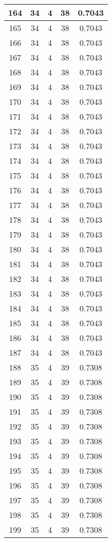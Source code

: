\documentclass[letterpaper, 12pt]{article}
\begin{document}
\begin{longtable}{|c|c|c|c|c|}
\hline
164 & 34 & 4 & 38 & 0.7043 \\
\hline
165 & 34 & 4 & 38 & 0.7043 \\
\hline
166 & 34 & 4 & 38 & 0.7043 \\
\hline
167 & 34 & 4 & 38 & 0.7043 \\
\hline
168 & 34 & 4 & 38 & 0.7043 \\
\hline
169 & 34 & 4 & 38 & 0.7043 \\
\hline
170 & 34 & 4 & 38 & 0.7043 \\
\hline
171 & 34 & 4 & 38 & 0.7043 \\
\hline
172 & 34 & 4 & 38 & 0.7043 \\
\hline
173 & 34 & 4 & 38 & 0.7043 \\
\hline
174 & 34 & 4 & 38 & 0.7043 \\
\hline
175 & 34 & 4 & 38 & 0.7043 \\
\hline
176 & 34 & 4 & 38 & 0.7043 \\
\hline
177 & 34 & 4 & 38 & 0.7043 \\
\hline
178 & 34 & 4 & 38 & 0.7043 \\
\hline
179 & 34 & 4 & 38 & 0.7043 \\
\hline
180 & 34 & 4 & 38 & 0.7043 \\
\hline
181 & 34 & 4 & 38 & 0.7043 \\
\hline
182 & 34 & 4 & 38 & 0.7043 \\
\hline
183 & 34 & 4 & 38 & 0.7043 \\
\hline
184 & 34 & 4 & 38 & 0.7043 \\
\hline
185 & 34 & 4 & 38 & 0.7043 \\
\hline
186 & 34 & 4 & 38 & 0.7043 \\
\hline
187 & 34 & 4 & 38 & 0.7043 \\
\hline
188 & 35 & 4 & 39 & 0.7308 \\
\hline
189 & 35 & 4 & 39 & 0.7308 \\
\hline
190 & 35 & 4 & 39 & 0.7308 \\
\hline
191 & 35 & 4 & 39 & 0.7308 \\
\hline
192 & 35 & 4 & 39 & 0.7308 \\
\hline
193 & 35 & 4 & 39 & 0.7308 \\
\hline
194 & 35 & 4 & 39 & 0.7308 \\
\hline
195 & 35 & 4 & 39 & 0.7308 \\
\hline
196 & 35 & 4 & 39 & 0.7308 \\
\hline
197 & 35 & 4 & 39 & 0.7308 \\
\hline
198 & 35 & 4 & 39 & 0.7308 \\
\hline
199 & 35 & 4 & 39 & 0.7308 \\
\hline
\end{longtable}
\end{document}
